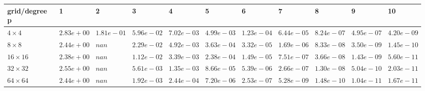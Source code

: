 \begin{tabular}{lllllllllll}
\hline
 grid/degree p   & 1          & 2          & 3          & 4          & 5          & 6          & 7          & 8          & 9          & 10         \\
\hline
 $4 \times 4$    & $2.83e+00$ & $1.81e-01$ & $5.96e-02$ & $7.02e-03$ & $4.99e-03$ & $1.23e-04$ & $6.44e-05$ & $8.24e-07$ & $4.95e-07$ & $4.20e-09$ \\
 $8 \times 8$    & $2.44e+00$ & $nan$      & $2.29e-02$ & $4.92e-03$ & $3.63e-04$ & $3.32e-05$ & $1.69e-06$ & $8.33e-08$ & $3.50e-09$ & $1.45e-10$ \\
 $16 \times 16$  & $2.38e+00$ & $nan$      & $1.12e-02$ & $3.39e-03$ & $2.38e-04$ & $1.49e-05$ & $7.51e-07$ & $3.66e-08$ & $1.43e-09$ & $5.60e-11$ \\
 $32 \times 32$  & $2.55e+00$ & $nan$      & $5.61e-03$ & $1.35e-03$ & $8.66e-05$ & $5.39e-06$ & $2.66e-07$ & $1.30e-08$ & $5.04e-10$ & $2.03e-11$ \\
 $64 \times 64$  & $2.44e+00$ & $nan$      & $1.92e-03$ & $2.44e-04$ & $7.20e-06$ & $2.53e-07$ & $5.28e-09$ & $1.48e-10$ & $1.04e-11$ & $1.67e-11$ \\
\hline
\end{tabular}